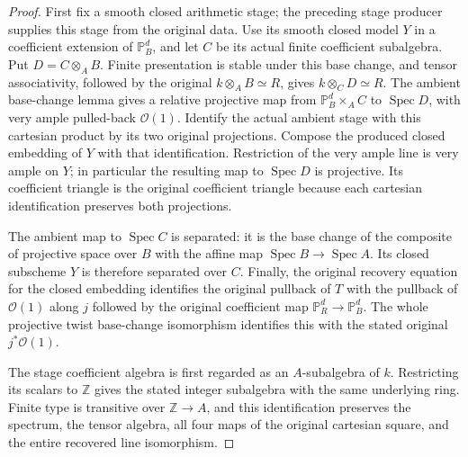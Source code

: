 \begin{proof}
First fix a smooth closed arithmetic stage; the preceding stage producer
supplies this stage from the original data.  Use its smooth closed model
$Y$ in a coefficient extension of $\mathbb P_B^d$, and let $C$ be its actual finite
coefficient subalgebra.  Put $D=C\otimes_A B$.  Finite
presentation is stable under this base change, and tensor
associativity, followed by the original $k\otimes_A B\simeq R$,
gives $k\otimes_C D\simeq R$.  The ambient base-change lemma
gives a relative projective map from
$\mathbb P_B^d\times_A C$ to $\operatorname{Spec}D$, with very
ample pulled-back $\mathcal O(1)$.  Identify the actual ambient
stage with this cartesian product by its two original projections.
Compose the produced closed embedding of $Y$ with that
identification.  Restriction of the very ample line is very ample
on $Y$; in particular the resulting map to
$\operatorname{Spec}D$ is projective.  Its coefficient triangle
is the original coefficient triangle because each cartesian
identification preserves both projections.

The ambient map to $\operatorname{Spec}C$ is separated: it is
the base change of the composite of projective space over $B$
with the affine map $\operatorname{Spec}B\to\operatorname{Spec}A$.
Its closed subscheme $Y$ is therefore separated over $C$.
Finally, the original recovery equation for the closed embedding
identifies the original pullback of $T$ with the pullback of
$\mathcal O(1)$ along $j$ followed by the original coefficient map
$\mathbb P_R^d\to\mathbb P_B^d$.  The whole projective twist
base-change isomorphism identifies this with the stated original
$j^*\mathcal O(1)$.

The stage coefficient algebra is first regarded as an $A$-subalgebra
of $k$.  Restricting its scalars to $\mathbb Z$ gives the stated
integer subalgebra with the same underlying ring.  Finite type is
transitive over $\mathbb Z\to A$, and this identification preserves
the spectrum, the tensor algebra, all four maps of the original
cartesian square, and the entire recovered line isomorphism.
\end{proof}
